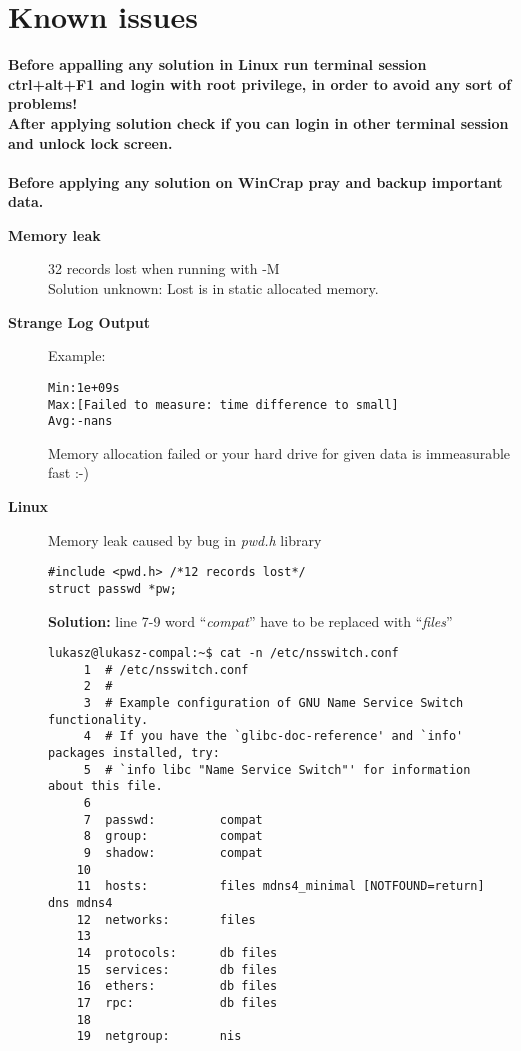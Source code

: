 \hypertarget{KnownIssues}{
\section{Known issues}
\label{KnownIssues}
}

{\bf Before appalling any solution in Linux run terminal session ctrl+alt+F1 and login with root privilege, in order to avoid any sort of problems!\\
After applying solution check if you can login in other terminal session and unlock lock screen.\\ \\
}
{\bf Before applying any solution on WinCrap pray and backup important data.
}

\begin{description}
\item [\bf{Memory leak}] 32 records lost when running with -M\\ Solution unknown: Lost is in static allocated memory.
\item [\bf{Strange Log Output}] Example: \begin{verbatim}
Min:1e+09s
Max:[Failed to measure: time difference to small]
Avg:-nans
\end{verbatim} Memory allocation failed or your hard drive for given data is immeasurable fast :-)

\item [{\bf Linux}] Memory leak caused by bug in {\itshape pwd.h} library
\begin{verbatim}
#include <pwd.h> /*12 records lost*/
struct passwd *pw;
\end{verbatim}
{\bf Solution:} line 7-9 word ``{\itshape compat}'' have to be replaced with ``{\itshape files}''
\begin{verbatim}
lukasz@lukasz-compal:~$ cat -n /etc/nsswitch.conf 
     1	# /etc/nsswitch.conf
     2	#
     3	# Example configuration of GNU Name Service Switch functionality.
     4	# If you have the `glibc-doc-reference' and `info' packages installed, try:
     5	# `info libc "Name Service Switch"' for information about this file.
     6	
     7	passwd:         compat
     8	group:          compat
     9	shadow:         compat
    10	
    11	hosts:          files mdns4_minimal [NOTFOUND=return] dns mdns4
    12	networks:       files
    13	
    14	protocols:      db files
    15	services:       db files
    16	ethers:         db files
    17	rpc:            db files
    18	
    19	netgroup:       nis
\end{verbatim}

\end{description}